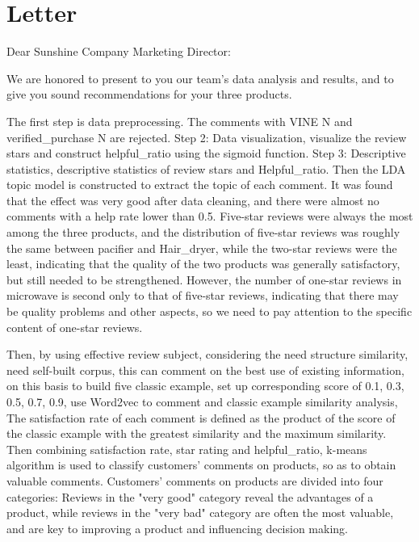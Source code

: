 \documentclass[../mcmpaper]{subfiles}
\begin{document}
    \section{Letter}
    \noindent{}Dear Sunshine Company Marketing Director:
    \par
    We are honored to present to you our team's data analysis and results, and to give you sound recommendations for your three products.
    \par
    The first step is data preprocessing. The comments with VINE N and verified\_purchase N are rejected. Step 2: Data visualization, visualize the review stars and construct helpful\_ratio using the sigmoid function. Step 3: Descriptive statistics, descriptive statistics of review stars and Helpful\_ratio. Then the LDA topic model is constructed to extract the topic of each comment. It was found that the effect was very good after data cleaning, and there were almost no comments with a help rate lower than 0.5. Five-star reviews were always the most among the three products, and the distribution of five-star reviews was roughly the same between pacifier and Hair\_dryer, while the two-star reviews were the least, indicating that the quality of the two products was generally satisfactory, but still needed to be strengthened. However, the number of one-star reviews in microwave is second only to that of five-star reviews, indicating that there may be quality problems and other aspects, so we need to pay attention to the specific content of one-star reviews.
    \par
    Then, by using effective review subject, considering the need structure similarity, need self-built corpus, this can comment on the best use of existing information, on this basis to build five classic example, set up corresponding score of 0.1, 0.3, 0.5, 0.7, 0.9, use Word2vec to comment and classic example similarity analysis, The satisfaction rate of each comment is defined as the product of the score of the classic example with the greatest similarity and the maximum similarity. Then combining satisfaction rate, star rating and helpful\_ratio, k-means algorithm is used to classify customers' comments on products, so as to obtain valuable comments. Customers' comments on products are divided into four categories: Reviews in the "very good" category reveal the advantages of a product, while reviews in the "very bad" category are often the most valuable, and are key to improving a product and influencing decision making.
    \par
\end{document}
